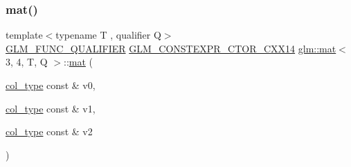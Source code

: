 \mbox{\label{structglm_1_1mat_3_013_00_014_00_01_t_00_01_q_01_4_a41261c393e633b1543f72532f0a6f78c}} 
\subsubsection{\texorpdfstring{mat()}{mat()}\hspace{0.1cm}{\footnotesize\ttfamily [6/21]}}
{\footnotesize\ttfamily template$<$typename T , qualifier Q$>$ \\
\mbox{\hyperlink{setup_8hpp_a33fdea6f91c5f834105f7415e2a64407}{G\+L\+M\+\_\+\+F\+U\+N\+C\+\_\+\+Q\+U\+A\+L\+I\+F\+I\+ER}} \mbox{\hyperlink{setup_8hpp_a0900f9145e68bf6061b6f5e7be3fa751}{G\+L\+M\+\_\+\+C\+O\+N\+S\+T\+E\+X\+P\+R\+\_\+\+C\+T\+O\+R\+\_\+\+C\+X\+X14}} \mbox{\hyperlink{structglm_1_1mat}{glm\+::mat}}$<$ 3, 4, T, Q $>$\+::\mbox{\hyperlink{structglm_1_1mat}{mat}} (\begin{DoxyParamCaption}\item[{\mbox{\hyperlink{structglm_1_1mat_3_013_00_014_00_01_t_00_01_q_01_4_aaa23c4674cbe2dc1eda1d826b8ef721e}{col\+\_\+type}} const \&}]{v0,  }\item[{\mbox{\hyperlink{structglm_1_1mat_3_013_00_014_00_01_t_00_01_q_01_4_aaa23c4674cbe2dc1eda1d826b8ef721e}{col\+\_\+type}} const \&}]{v1,  }\item[{\mbox{\hyperlink{structglm_1_1mat_3_013_00_014_00_01_t_00_01_q_01_4_aaa23c4674cbe2dc1eda1d826b8ef721e}{col\+\_\+type}} const \&}]{v2 }\end{DoxyParamCaption})}

\mbox{\label{structglm_1_1mat_3_013_00_014_00_01_t_00_01_q_01_4_a789aeb16a52b123e18e519b41ecfc4f3}} 
